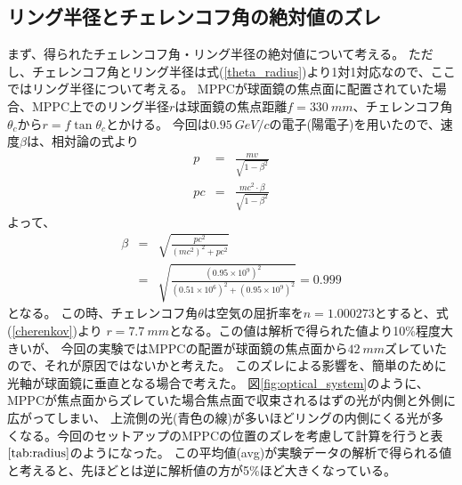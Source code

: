 \documentclass[uplatex, titlepage, dvipdfmx, 12pt, a4paper]{jsreport}
\begin{document}
    \subsection{リング半径とチェレンコフ角の絶対値のズレ}
    まず、得られたチェレンコフ角・リング半径の絶対値について考える。
    ただし、チェレンコフ角とリング半径は式(\ref{theta_radius})より1対1対応なので、ここではリング半径について考える。
    MPPCが球面鏡の焦点面に配置されていた場合、MPPC上でのリング半径$r$は球面鏡の焦点距離$f=\SI{330}{mm}$、チェレンコフ角$\theta_{c}$から$r=f\tan{\theta_{c}}$とかける。
    今回は$\SI{0.95}{GeV/c}$の電子(陽電子)を用いたので、速度$\beta$は、相対論の式より
    \begin{eqnarray}
      p &=& \frac{mv}{\sqrt{1-{\beta}^2}} \nonumber \\
      pc &=& \frac{mc^2\cdot \beta}{\sqrt{1-{\beta}^2}} \nonumber 
    \end{eqnarray}
    よって、
    \begin{eqnarray}
      \beta &=& \sqrt{\frac{{pc}^2}{\left(mc^2\right)^2 + {pc}^2}} \nonumber \\
      &=& \sqrt{\frac{\left(0.95\times 10^9\right)^2}{\left(0.51\times 10^6\right)^2 + \left(0.95\times 10^9\right)^2}} = 0.999 \nonumber
    \end{eqnarray}
    となる。
    この時、チェレンコフ角$\theta$は空気の屈折率を$n=1.000273$とすると、式(\ref{cherenkov})より
    $r=\SI{7.7}{mm}$となる。この値は解析で得られた値より10\%程度大きいが、
    今回の実験ではMPPCの配置が球面鏡の焦点面から$\SI{42}{mm}$ズレていたので、それが原因ではないかと考えた。
    このズレによる影響を、簡単のために光軸が球面鏡に垂直となる場合で考えた。
    図\ref{fig:optical_system}のように、MPPCが焦点面からズレていた場合焦点面で収束されるはずの光が内側と外側に広がってしまい、
    上流側の光(青色の線)が多いほどリングの内側にくる光が多くなる。今回のセットアップのMPPCの位置のズレを考慮して計算を行うと表$\ref{tab:radius}$のようになった。
    この平均値(avg)が実験データの解析で得られる値と考えると、先ほどとは逆に解析値の方が5\%ほど大きくなっている。\\
\end{document}
